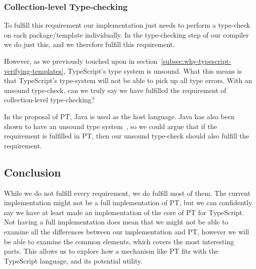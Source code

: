 \subsubsection{Collection-level Type-checking}\label{subsubsec:implementation-collection-level-type-checking}

To fulfill this requirement our implementation just needs to perform a type-check on each package/template individually.
In the type-checking step of our compiler we do just this, and we therefore fulfill this requirement.

However, as we previously touched upon in section~\vref{subsec:why-typescript-verifying-templates}, TypeScript's type system is unsound.
What this means is that TypeScript's type-system will not be able to pick up all type errors.
With an unsound type-check, can we truly say we have fulfilled the requirement of collection-level type-checking?

In the proposal of PT, Java is used as the host language.
Java has also been shown to have an unsound type system~\cite{java-unsound}, so we could argue that if the requirement is fulfilled in PT, then our unsound type-check should also fulfill the requirement.

\subsection{Conclusion}\label{subsec:requirements-conclusion}

While we do not fulfill every requirement, we do fulfill most of them.
The current implementation might not be a full implementation of PT, but we can confidently say we have at least made an implementation of the core of PT for TypeScript.
Not having a full implementation does mean that we might not be able to examine all the differences between our implementation and PT, however we will be able to examine the common elements, which covers the most interesting parts.
This allows us to explore how a mechanism like PT fits with the TypeScript language, and its potential utility.